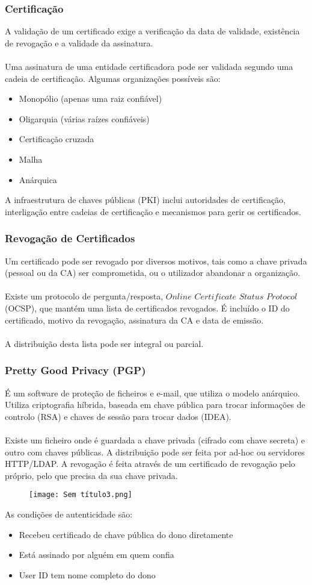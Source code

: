 \documentclass[10pt,a4paper]{report}
\begin{document}
\subsubsection{Certificação}
A validação de um certificado exige a verificação da data de validade, existência de revogação e a validade da assinatura.\\
\\
Uma assinatura de uma entidade certificadora pode ser validada segundo uma cadeia de certificação. Algumas organizações possíveis são:
\begin{itemize}
\item Monopólio (apenas uma raiz confiável)
\item Oligarquia (várias raízes confiáveis)
\item Certificação cruzada
\item Malha
\item Anárquica
\end{itemize}
A infraestrutura de chaves públicas (PKI) inclui autoridades de certificação, interligação entre cadeias de certificação e mecanismos para gerir os certificados.
\subsubsection{Revogação de Certificados}
Um certificado pode ser revogado por diversos motivos, tais como a chave privada (pessoal ou da CA) ser comprometida, ou o utilizador abandonar a organização.\\
\\
Existe um protocolo de pergunta/resposta, $Online$ $Certificate$ $Status$ $Protocol$ (OCSP), que mantém uma lista de certificados revogados. É incluído o ID do certificado, motivo da revogação, assinatura da CA e data de emissão.\\
\\
A distribuição desta lista pode ser integral ou parcial.
\subsubsection{Pretty Good Privacy (PGP)}
É um software de proteção de ficheiros e e-mail, que utiliza o modelo anárquico. Utiliza criptografia híbrida, baseada em chave pública para trocar informações de controlo (RSA) e chaves de sessão para trocar dados (IDEA).\\
\\
Existe um ficheiro onde é guardada a chave privada (cifrado com chave secreta) e outro com chaves públicas. A distribuição pode ser feita por ad-hoc ou servidores HTTP/LDAP. A revogação é feita através de um certificado de revogação pelo próprio, pelo que precisa da sua chave privada.
\begin{figure}[H]
\centering
\texttt{[image: Sem título3.png]}
\end{figure}
As condições de autenticidade são:
\begin{itemize}
\item Recebeu certificado de chave pública do dono diretamente
\item Está assinado por alguém em quem confia
\item User ID tem nome completo do dono
\end{itemize}
\end{document}
